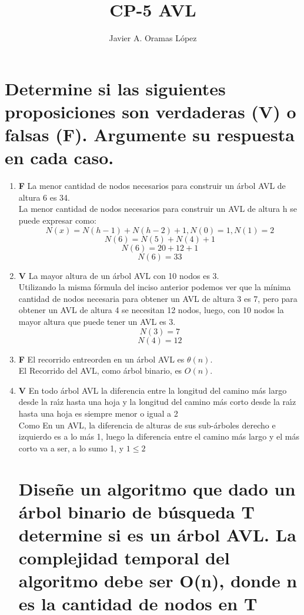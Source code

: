 \documentclass{article}
\author{Javier A. Oramas López}
\title{CP-5 AVL}
\begin{document}
    \maketitle

    \section{ Determine si las siguientes proposiciones son verdaderas (V) o falsas (F). Argumente su respuesta en cada caso.}
        \begin{enumerate}
            \item \textbf{F} La menor cantidad de nodos necesarios para construir un árbol AVL de altura 6 es 34. \\
                La menor cantidad de nodos necesarios para construir un AVL de altura h se puede expresar como:\\
                \[N(x) = N(h-1) + N(h-2) + 1, N(0) = 1, N(1) = 2\]
                \[N(6) = N(5) + N(4) + 1\]
                \[N(6) = 20 + 12 + 1\]
                \[N(6) = 33\]
            \item \textbf{V} La mayor altura de un árbol AVL con 10 nodos es 3.\\
                Utilizando la misma fórmula del inciso anterior podemos ver que la mínima cantidad de nodos necesaria para
                obtener un AVL de altura 3 es 7, pero para obtener un AVL de altura 4 se necesitan 12 nodos, luego, con 10 
                nodos la mayor altura que puede tener un AVL es 3.
                \[N(3) = 7\]
                \[N(4) = 12\]
            \item \textbf{F} El recorrido entreorden en un árbol AVL es $\theta(n)$.\\
                El Recorrido del AVL, como árbol binario, es $O(n)$.
            
            \item \textbf{V} En todo árbol AVL la diferencia entre la longitud del camino más largo desde la raı́z hasta una hoja
            y la longitud del camino más corto desde la raı́z hasta una hoja es siempre menor o igual a 2\\
                Como En un AVL, la diferencia de alturas de sus sub-árboles derecho e izquierdo es a lo más 1, luego la diferencia
                entre el camino más largo y el más corto va a ser, a lo sumo 1, y $1 \leq 2$
        \section{ Diseñe un algoritmo que dado un árbol binario de búsqueda T determine si es un árbol AVL. La complejidad
        temporal del algoritmo debe ser O(n), donde n es la cantidad de nodos en T }
        
        \end{enumerate}
\end{document}
